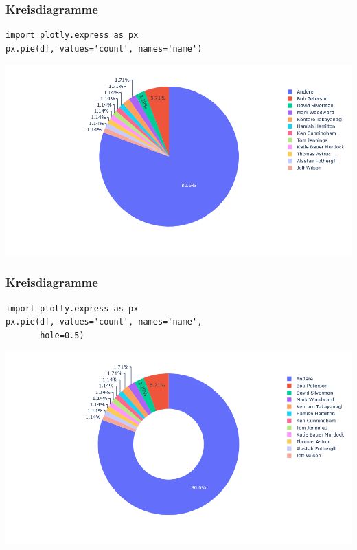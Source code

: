\begin{frame}[fragile]
\frametitle{Kreisdiagramme}

\begin{verbatim}
import plotly.express as px
px.pie(df, values='count', names='name')
\end{verbatim}

\vspace{-\baselineskip}

\begin{center}
\includegraphics[width=0.85\linewidth]{fig5/pie2.png}
\end{center}
\end{frame}


\begin{frame}[fragile]
\frametitle{Kreisdiagramme}

\begin{verbatim}
import plotly.express as px
px.pie(df, values='count', names='name',
       hole=0.5)
\end{verbatim}

\vspace{-\baselineskip}

\begin{center}
\includegraphics[width=0.85\linewidth]{fig5/pie3.png}
\end{center}
\end{frame}


